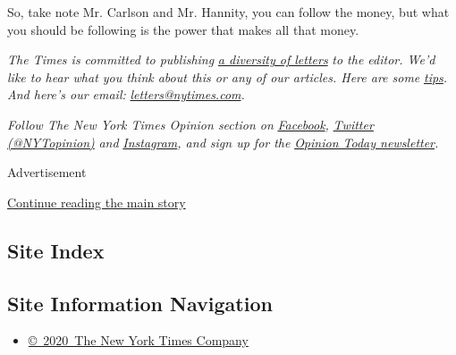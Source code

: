 So, take note Mr. Carlson and Mr. Hannity, you can follow the money, but
what you should be following is the power that makes all that money.

\emph{The Times is committed to publishing}
\href{https://www.nytimes.com/2019/01/31/opinion/letters/letters-to-editor-new-york-times-women.html}{\emph{a
diversity of letters}} \emph{to the editor. We'd like to hear what you
think about this or any of our articles. Here are some}
\href{https://help.nytimes.com/hc/en-us/articles/115014925288-How-to-submit-a-letter-to-the-editor}{\emph{tips}}\emph{.
And here's our email:}
\href{mailto:letters@nytimes.com}{\emph{letters@nytimes.com}}\emph{.}

\emph{Follow The New York Times Opinion section on}
\href{https://www.facebook.com/nytopinion}{\emph{Facebook}}\emph{,}
\href{http://twitter.com/NYTOpinion}{\emph{Twitter (@NYTopinion)}}
\emph{and}
\href{https://www.instagram.com/nytopinion/}{\emph{Instagram}}\emph{,
and sign up for the}
\href{http://www.nytimes.com/newsletters/opiniontoday/}{\emph{Opinion
Today newsletter}}\emph{.}

Advertisement

\protect\hyperlink{after-bottom}{Continue reading the main story}

\hypertarget{site-index}{%
\subsection{Site Index}\label{site-index}}

\hypertarget{site-information-navigation}{%
\subsection{Site Information
Navigation}\label{site-information-navigation}}

\begin{itemize}
\tightlist
\item
  \href{https://help.nytimes.com/hc/en-us/articles/115014792127-Copyright-notice}{©~2020~The
  New York Times Company}
\end{itemize}

